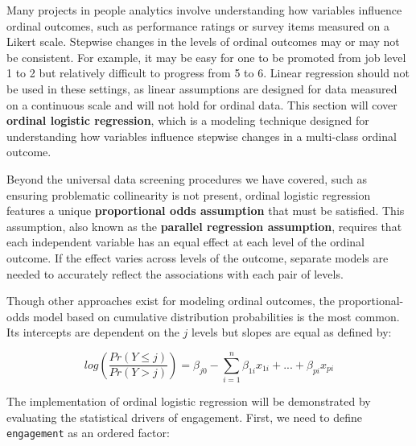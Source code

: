 \documentclass[
]{book}
\newenvironment{Shaded}{\begin{snugshade}}{\end{snugshade}}
\newcommand{\AttributeTok}[1]{\textcolor[rgb]{0.77,0.63,0.00}{#1}}
\newcommand{\CommentTok}[1]{\textcolor[rgb]{0.56,0.35,0.01}{\textit{#1}}}
\newcommand{\DecValTok}[1]{\textcolor[rgb]{0.00,0.00,0.81}{#1}}
\newcommand{\FunctionTok}[1]{\textcolor[rgb]{0.00,0.00,0.00}{#1}}
\newcommand{\NormalTok}[1]{#1}
\newcommand{\OtherTok}[1]{\textcolor[rgb]{0.56,0.35,0.01}{#1}}
\newcommand{\SpecialCharTok}[1]{\textcolor[rgb]{0.00,0.00,0.00}{#1}}
\begin{document}
Many projects in people analytics involve understanding how variables influence ordinal outcomes, such as performance ratings or survey items measured on a Likert scale. Stepwise changes in the levels of ordinal outcomes may or may not be consistent. For example, it may be easy for one to be promoted from job level 1 to 2 but relatively difficult to progress from 5 to 6. Linear regression should not be used in these settings, as linear assumptions are designed for data measured on a continuous scale and will not hold for ordinal data. This section will cover \textbf{ordinal logistic regression}, which is a modeling technique designed for understanding how variables influence stepwise changes in a multi-class ordinal outcome.

Beyond the universal data screening procedures we have covered, such as ensuring problematic collinearity is not present, ordinal logistic regression features a unique \textbf{proportional odds assumption} that must be satisfied. This assumption, also known as the \textbf{parallel regression assumption}, requires that each independent variable has an equal effect at each level of the ordinal outcome. If the effect varies across levels of the outcome, separate models are needed to accurately reflect the associations with each pair of levels.

Though other approaches exist for modeling ordinal outcomes, the proportional-odds model based on cumulative distribution probabilities is the most common. Its intercepts are dependent on the \(j\) levels but slopes are equal as defined by:

\[ log(\frac{Pr(Y \le j)} {Pr(Y > j)}) = \beta_{j0} - \displaystyle\sum_{i=1}^{n} \beta_{1i} x_{1i} + ... + \beta_{pi} x_{pi} \]

The implementation of ordinal logistic regression will be demonstrated by evaluating the statistical drivers of engagement. First, we need to define \texttt{engagement} as an ordered factor:

\begin{Shaded}
\end{Shaded}
\end{document}
